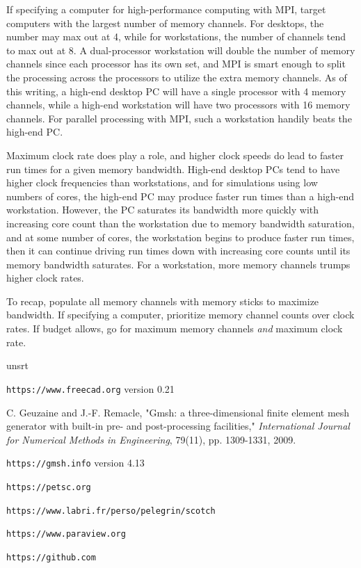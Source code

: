 \documentclass[titlepage]{article}
\renewcommand\_{\textunderscore\linebreak[1]}
\begin{document}
If specifying a computer for high-performance computing with MPI, target computers with the largest number of memory channels.  For desktops, the number may max out at 4, while for workstations, the number of channels tend to max out at 8.  A dual-processor workstation will double the number of memory channels since each processor has its own set, and MPI is smart enough to split the processing across the processors to utilize the extra memory channels. As of this writing, a high-end desktop PC will have a single processor with 4 memory channels, while a high-end workstation will have two processors with 16 memory channels.  For parallel processing with MPI, such a workstation handily beats the high-end PC.

Maximum clock rate does play a role, and higher clock speeds do lead to faster run times for a given memory bandwidth.  High-end desktop PCs tend to have higher clock frequencies than workstations, and for simulations using low numbers of cores, the high-end PC may produce faster run times than a high-end workstation.  However, the PC saturates its bandwidth more quickly with increasing core count than the workstation due to memory bandwidth saturation, and at some number of cores, the workstation begins to produce faster run times, then it can continue driving run times down with increasing core counts until its memory bandwidth saturates.  For a workstation, more memory channels trumps higher clock rates.

To recap, populate all memory channels with memory sticks to maximize bandwidth. If specifying a computer, prioritize memory channel counts over clock rates.  If budget allows, go for maximum memory channels \textit{and} maximum clock rate.

\begin{thebibliography}{unsrt}

 \verb+https://www.freecad.org+ version 0.21

 C. Geuzaine and J.-F. Remacle, "Gmsh: a three-dimensional finite element mesh generator with built-in pre- and post-processing facilities," \textit{International Journal for Numerical Methods in Engineering}, 79(11), pp. 1309-1331, 2009.

 \verb+https://gmsh.info+ version 4.13

 \verb+https://petsc.org+

 \verb+https://www.labri.fr/perso/pelegrin/scotch+

 \verb+https://www.paraview.org+

 \verb+https://github.com+

\end{thebibliography}
\end{document}
